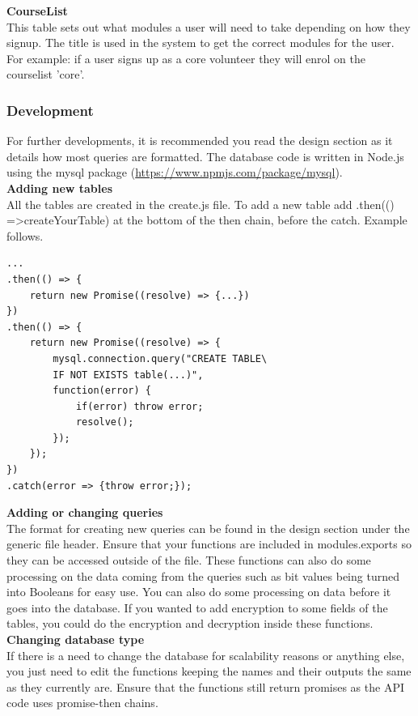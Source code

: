 \documentclass[12pt]{article}
\begin{document}
\noindent
\textbf{CourseList}\\
This table sets out what modules a user will need to take depending on how they signup. The title is used in the system to get the correct modules for the user. For example: if a user signs up as a core volunteer they will enrol on the courselist 'core'.\\

\subsubsection{Development}
For further developments, it is recommended you read the design section as it details how most queries are formatted. The database code is written in Node.js using the mysql package (\href{https://www.npmjs.com/package/mysql}{https://www.npmjs.com/package/mysql}).\\

\noindent
\textbf{Adding new tables}\\
All the tables are created in the create.js file. To add a new table add .then(() =\textgreater createYourTable) at the bottom of the then chain, before the catch. Example follows.
\newpage
\begin{lstlisting}
...
.then(() => {
	return new Promise((resolve) => {...})
})
.then(() => {
	return new Promise((resolve) => {
		mysql.connection.query("CREATE TABLE\
		IF NOT EXISTS table(...)",
		function(error) {
			if(error) throw error;
			resolve();
		});
	});
})
.catch(error => {throw error;});
\end{lstlisting}

\noindent
\textbf{Adding or changing queries}\\
The format for creating new queries can be found in the design section under the generic file header. Ensure that your functions are included in modules.exports so they can be accessed outside of the file. These functions can also do some processing on the data coming from the queries such as bit values being turned into Booleans for easy use. You can also do some processing on data before it goes into the database. If you wanted to add encryption to some fields of the tables, you could do the encryption and decryption inside these functions.\\ 

\noindent
\textbf{Changing database type}\\
If there is a need to change the database for scalability reasons or anything else, you just need to edit the functions keeping the names and their outputs the same as they currently are. Ensure that the functions still return promises as the API code uses promise-then chains.
\end{document}
